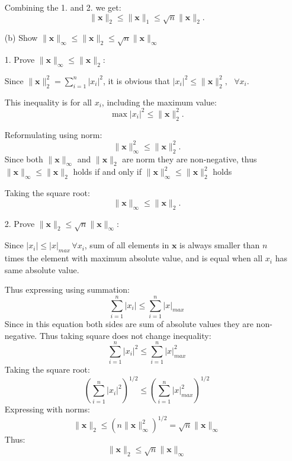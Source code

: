 \documentclass[12pt]{article}
\newcommand{\bvec}[1]{\mathbf{#1}} %
\begin{document}
\begin{itemize}
    Combining the 1. and 2. we get:
    \[
    \|\mathbf{x}\|_2 \leq \|\mathbf{x}\|_1 \leq \sqrt{n} \|\mathbf{x}\|_2.
    \]
    \vspace{\baselineskip}

    \item[(b)] Show \( \|\mathbf{x}\|_\infty \leq \|\mathbf{x}\|_2 \leq \sqrt{n} \|\mathbf{x}\|_\infty \)

    
    \vspace{\baselineskip}

    1. Prove \( \|\mathbf{x}\|_\infty \leq \|\mathbf{x}\|_2 \):
    
    Since \( \|\mathbf{x}\|_2^2 = \sum_{i=1}^n |x_i|^2 \), it is obvious that \( |x_i|^2 \leq \|\mathbf{x}\|_2^2, 
    \text{ }\forall x_i\).  
    
    This inequality is for all $x_i$, including the maximum value:
    \[
    \max |x_i|^2 \leq \|\mathbf{x}\|_2^2.
    \]
    
    Reformulating using norm:
    \[
    \|\bvec{x}\|_{\infty}^2 \le \|\mathbf{x}\|_2^2.
    \]
    Since both $    \|\bvec{x}\|_{\infty}$ and $ \|\mathbf{x}\|_2$ are norm they are non-negative, thus
    $    \|\bvec{x}\|_{\infty} \le \|\mathbf{x}\|_2$ holds if and only if $    \|\bvec{x}\|_{\infty}^2 \le \|\mathbf{x}\|_2^2$ holds 
    
    Taking the square root:
    \[
    \|\mathbf{x}\|_\infty \leq \|\mathbf{x}\|_2.
    \]

    2. Prove \( \|\mathbf{x}\|_2 \leq \sqrt{n} \|\mathbf{x}\|_\infty \):
    
    Since \( |x_i| \leq |x|_{max} \, \forall x_i \), sum of all elements in $\bvec{x}$ is 
    always smaller than
    $n$ times the element with maximum absolute value, and is equal when all $x_i$ has same absolute value.
    
    Thus expressing using summation:
    \[
    \sum_{i=1}^n |x_i| \leq \sum_{i=1}^n |x|_{max}
    \]
    Since in this equation both sides are sum of absolute values they are non-negative.
    Thus taking square does not change inequality: 
    \[
    \sum_{i=1}^n |x_i|^2 \leq \sum_{i=1}^n |x|_{max}^2
    \]
    Taking the square root:
    \[
    \left( \sum_{i=1}^n |x_i|^2\right)^{1/2} \leq \left( \sum_{i=1}^n |x|_{max}^2 \right)^{1/2}
    \]
    Expressing with norms:
    \[
    \|\mathbf{x}\|_2 \leq  \left(n  \|\mathbf{x}\|_\infty^2\right)^{1/2}= \sqrt{n} \|\mathbf{x}\|_\infty
    \]
    Thus:
    \[
    \|\mathbf{x}\|_2 \leq \sqrt{n} \|\mathbf{x}\|_\infty
    \]


\end{itemize}
\end{document}
